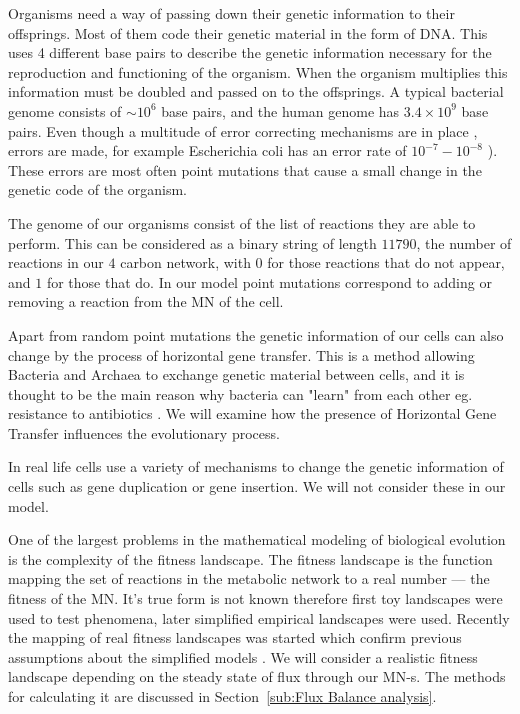 \documentclass[a4paper,12pt]{article}
\begin{document}
	Organisms need a way of passing down their genetic information to their offsprings. 
	Most of them code their genetic material in the form of DNA. This uses 4 different base pairs to describe the genetic information necessary for the reproduction and functioning of the organism. When the organism multiplies this information must be doubled and passed on to the offsprings. A typical bacterial genome consists of $\sim 10^6$ base pairs, and the human genome has $3.4 \times 10^9$ base pairs. Even though a multitude of error correcting mechanisms are in place \cite{dnarepair}, errors are made, for example Escherichia coli has an error rate of $10^{-7} - 10^{-8}$ \cite{dnaerrorrate}). These errors are most often point mutations that cause a small change in the genetic code of the organism.
	
	The genome of our organisms consist of the list of reactions they are able to perform. This can be considered as a binary string of length $11790$, the number of reactions in our $4$ carbon network, with $0$ for those reactions that do not appear, and $1$ for those that do. In our model point mutations correspond to adding or removing a reaction from the MN of the cell.

	Apart from random point mutations  the genetic information of our cells can also change by the process of horizontal gene transfer. This is a method allowing Bacteria and Archaea to exchange genetic material between cells, and it is thought to be the main reason why bacteria can "learn" from each other eg. resistance to antibiotics \cite{horizontalAntibiotics}\cite{horizontalgenetransfer}. We will examine how the presence of Horizontal Gene Transfer influences the evolutionary process.

	In real life cells use a variety of mechanisms to change the genetic information of cells such as gene duplication or gene insertion. We will not consider these in our model. 


	One of the largest problems in the mathematical modeling of biological evolution is the complexity of the fitness landscape. The fitness landscape is the function mapping the set of reactions in the metabolic network to a real number --- the fitness of the MN. It's true form is not known therefore first toy landscapes were used to test phenomena, later simplified empirical landscapes were used. Recently the mapping of real fitness landscapes was started which confirm previous assumptions about the simplified models \cite{fitnesslandscape}. We will consider a realistic fitness landscape depending on the steady state of flux through our MN-s. The methods for calculating it are discussed in Section~\ref{sub:Flux Balance analysis}.
\end{document}
